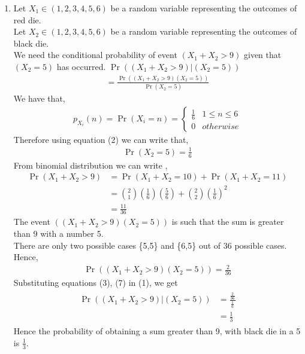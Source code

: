 \documentclass[10pt,twocolumn]{article}
\providecommand{\pr}[1]{\ensuremath{\Pr\left(#1\right)}}
\providecommand{\brak}[1]{\ensuremath{\left(#1\right)}}
\begin{document}
\begin{enumerate}
\item 
Let $X_1 \in \brak{1,2,3,4,5,6}$ be a random variable representing the outcomes of red die.\\
Let $X_2 \in \brak{1,2,3,4,5,6}$ be a random variable representing the outcomes of black die. \\
We need the conditional probability of event $(X_1 + X_2 > 9)$ given that $(X_2 = 5)$ has occurred.
$\Pr{\brak{\brak{X_1 + X_2 > 9}|\brak{X_2=5}}}$
\begin{align}
=\frac{\Pr{((X_1 + X_2 > 9)(X_2=5))}}{\Pr{\brak{X_2=5}}}
\end{align}
We have that,
\begin{align}
p_{X_i}(n) = \pr{X_i = n} = 
\begin{cases}
\frac{1}{6} & 1 \le n \le 6 \\
0 & otherwise
\end{cases}
\end{align}
Therefore using equation (2) we can write that, 
\begin{align}
\Pr{(X_2=5)} = \frac{1}{6}
\end{align}
From binomial distribution we can write ,
\begin{align}
\Pr{(X_1 + X_2 > 9)}&= \Pr{(X_1 + X_2 =10)}+\Pr{(X_1 + X_2=11)} \\ 
&= \binom{2}{1} \brak {\frac{1}{6}}\brak {\frac{5}{6}}+\binom{2}{2} \brak {\frac{1}{6}}^2\\
&= \frac{11}{36}
\end{align}
The event ${((X_1 + X_2 > 9)(X_2=5))}$ is such that the sum is greater than 9 with a number 5. \\
There are only two possible cases \{5,5\} and \{6,5\} out of 36 possible cases.\\
Hence,
\begin{align}
\Pr{((X_1 + X_2 > 9)(X_2=5))}=\frac{2}{36}
\end{align}
Substituting equations (3), (7) in (1), we get
\begin{align}
\begin{split}
\Pr{\brak{\brak{X_1 + X_2 > 9}|\brak{X_2=5}}} &= 
\frac{\frac{2}{36}}{\frac{1}{6}}\\
&=\frac{1}{3}
\end{split}
\end{align}  
Hence the probability of obtaining a sum greater than 9, with black die in a 5 is $\frac{1}{3}$. 


\end{enumerate}
\end{document}
